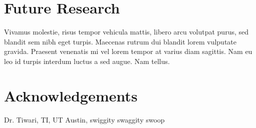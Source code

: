 \documentclass[a0,landscape]{a0poster}
\begin{document}
\begin{multicols}{3}
\color{DarkSlateGray} %


\section*{Future Research}

Vivamus molestie, risus tempor vehicula mattis, libero arcu volutpat purus, sed blandit sem nibh eget turpis. Maecenas rutrum dui blandit lorem vulputate gravida. Praesent venenatis mi vel lorem tempor at varius diam sagittis. Nam eu leo id turpis interdum luctus a sed augue. Nam tellus.



\section*{Acknowledgements}

Dr. Tiwari, TI, UT Austin, swiggity swaggity swoop


\end{multicols}
\end{document}
